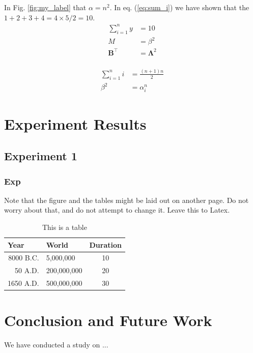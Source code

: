 \documentclass{svproc}
\begin{document}
    
    In Fig. \ref{fig:my_label} that $\alpha = n^2$. In eq. (\ref{eq:sum_i}) we have shown that the $ 1+2+3+4 = 4\times 5 /2=10$.
    \begin{align*}
        \sum_{i=1}^{n} y &= 10 \\
        M &= \beta ^2 \\
        \boldsymbol{B}^\top &= \boldsymbol{\Lambda}^2 \\
    \end{align*}
    
    \begin{align}
        \label{eq:sum_i}
        \sum_{i=1}^n i &= \frac{(n+1)n}{2} \\  
        \nonumber
        \beta ^2 &= \alpha_i^n
    \end{align}

\section{Experiment Results}
    \subsection{Experiment 1}
        \subsubsection{Exp}
    Note that the figure and the tables might be laid out on another page. Do not worry about that, and do not attempt to change it. Leave this to Latex.
    
    
    \begin{table}
        \caption{This is a table}
        \begin{center}
            \begin{tabular}{rlc}
                \hline
                \multicolumn{1}{l}{Year}&\multicolumn{1}{l}{World}&\multicolumn{1}{l}{Duration}\\
                \hline
                8000 B.C.  &     5,000,000 &  10\\
                  50 A.D.  &   200,000,000 &  20\\
                1650 A.D.  &   500,000,000 &  30\\
                \hline
            \end{tabular}
        \end{center}
    \end{table}

\section{Conclusion and Future Work}
We have conducted a study on ...

\printbibliography 
\end{document}

